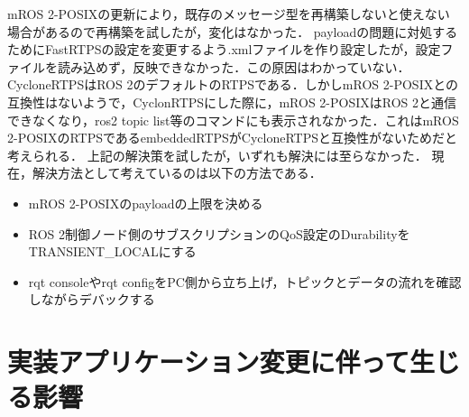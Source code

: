 mROS 2-POSIXの更新により，既存のメッセージ型を再構築しないと使えない場合があるので再構築を試したが，変化はなかった．
payloadの問題に対処するためにFastRTPSの設定を変更するよう.xmlファイルを作り設定したが，設定ファイルを読み込めず，反映できなかった．この原因はわかっていない．
CycloneRTPSはROS 2のデフォルトのRTPSである．しかしmROS 2-POSIXとの互換性はないようで，CyclonRTPSにした際に，mROS 2-POSIXはROS 2と通信できなくなり，ros2 topic list等のコマンドにも表示されなかった．これはmROS 2-POSIXのRTPSであるembeddedRTPSがCycloneRTPSと互換性がないためだと考えられる．
上記の解決策を試したが，いずれも解決には至らなかった．
現在，解決方法として考えているのは以下の方法である．
\begin{itemize}
    \item mROS 2-POSIXのpayloadの上限を決める
    \item ROS 2制御ノード側のサブスクリプションのQoS設定のDurabilityをTRANSIENT\_LOCALにする
    \item rqt consoleやrqt configをPC側から立ち上げ，トピックとデータの流れを確認しながらデバックする
\end{itemize}

\section{実装アプリケーション変更に伴って生じる影響}


